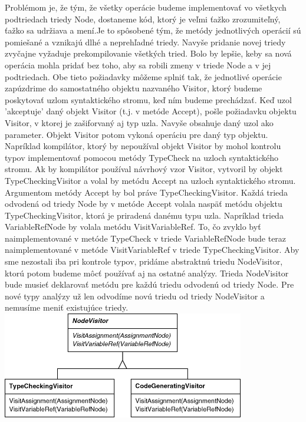 		Problémom je, že tým, že všetky operácie budeme implementovať vo všetkych podtriedach triedy Node, dostaneme kód, ktorý je veľmi ťažko zrozumiteľný, ťažko sa udržiava a mení.Je to spôsobené tým, že metódy jednotlivých operácií sú pomiešané a vznikajú dlhé a neprehľadné triedy. Navyše pridanie novej triedy zvyčajne vyžaduje prekompilovanie všetkých tried. Bolo by lepšie, keby sa nová operácia mohla pridať bez toho, aby sa robili zmeny v triede Node a v jej podtriedach. Obe tieto požiadavky môžeme splniť tak, že jednotlivé operácie zapúzdrime do samostatného objektu nazvaného Visitor, ktorý budeme poskytovať uzlom syntaktického stromu, keď ním budeme prechádzať. Keď uzol 'akceptuje' daný objekt Visitor (t.j. v metóde Accept), pošle požiadavku objektu Visitor, v ktorej je zašiforvaný aj typ uzla. Navyše obsahuje daný uzol ako parameter. Objekt Visitor potom vykoná operáciu pre daný typ objektu. Napríklad kompilátor, ktorý by nepoužíval objekt Visitor by mohol kontrolu typov implementovať pomocou metódy TypeCheck na uzloch syntaktického stromu. Ak by kompilátor používal návrhový vzor Visitor, vytvoril by objekt TypeCheckingVisitor a volal by metódu Accept na uzloch syntaktického stromu. Argumentom metódy Accept by bol práve TypeCheckingVisitor. Každá trieda odvodená od triedy Node by v metóde Accept volala naspäť metódu objektu TypeCheckingVisitor, ktorá je priradená danému typu uzla. Napríklad trieda VariableRefNode by volala metódu VisitVariableRef. To, čo zvyklo byť naimplementované v metóde TypeCheck v triede VariableRefNode bude teraz naimplementované v metóde VisitVariableRef v triede TypeCheckingVisitor. Aby sme nezostali iba pri kontrole typov, pridáme abstraktnú triedu NodeVisitor, ktorú potom budeme môcť používať aj na ostatné analýzy. Trieda NodeVisitor bude musieť deklarovať metódu pre každú triedu odvodenú od triedy Node. Pre nové typy analýzy už len odvodíme novú triedu od triedy NodeVisitor a nemusíme meniť existujúce triedy.\\


		\includegraphics[width=.7\textwidth]{images/programovanie/visitor2}






